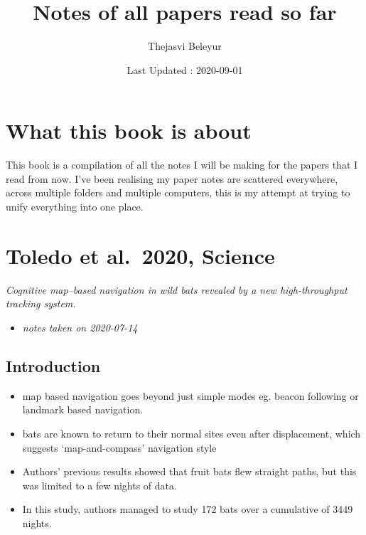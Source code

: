 \documentclass[
]{book}
\title{Notes of all papers read so far}
\author{Thejasvi Beleyur}
\date{Last Updated : 2020-09-01}
\providecommand{\tightlist}{%
  \setlength{\itemsep}{0pt}\setlength{\parskip}{0pt}}
\begin{document}
\maketitle

{
\setcounter{tocdepth}{1}
\tableofcontents
}
\hypertarget{what-this-book-is-about}{%
\chapter*{What this book is about}\label{what-this-book-is-about}}

This book is a compilation of all the notes I will be making for the papers that I read from now.
I've been realising my paper notes are scattered everywhere, across multiple folders and multiple computers,
this is my attempt at trying to unify everything into one place.

\hypertarget{toledo-et-al.-2020-science}{%
\chapter{Toledo et al.~2020, Science}\label{toledo-et-al.-2020-science}}


\emph{Cognitive map--based navigation in wild bats revealed by a new high-throughput tracking system.} \citep{toledo2020cognitive}

\begin{itemize}
\tightlist
\item
  \emph{notes taken on 2020-07-14}
\end{itemize}

\hypertarget{introduction}{%
\section{Introduction}\label{introduction}}

\begin{itemize}
\tightlist
\item
  map based navigation goes beyond just simple modes eg. beacon following or landmark based navigation.
\item
  bats are known to return to their normal sites even after displacement, which suggests `map-and-compass' navigation style
\item
  Authors' previous results showed that fruit bats flew straight paths, but this was limited to a few nights of data.
\item
  In this study, authors managed to study 172 bats over a cumulative of 3449 nights.
\end{itemize}
\end{document}
